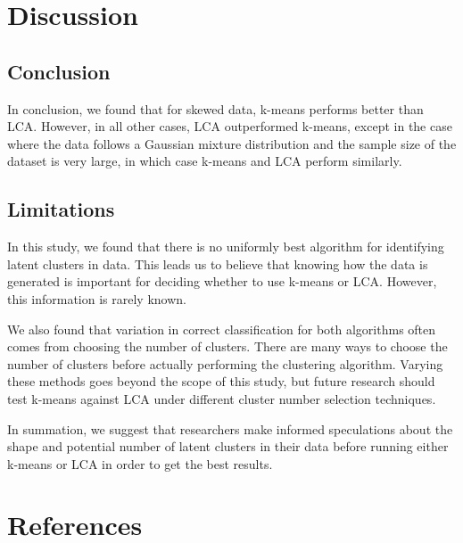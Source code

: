 \documentclass[
]{article}
\begin{document}
\hypertarget{discussion}{%
\section{Discussion}\label{discussion}}

\hypertarget{conclusion}{%
\subsection{Conclusion}\label{conclusion}}

In conclusion, we found that for skewed data, k-means performs better
than LCA. However, in all other cases, LCA outperformed k-means, except
in the case where the data follows a Gaussian mixture distribution and
the sample size of the dataset is very large, in which case k-means and
LCA perform similarly.

\hypertarget{limitations}{%
\subsection{Limitations}\label{limitations}}

In this study, we found that there is no uniformly best algorithm for
identifying latent clusters in data. This leads us to believe that
knowing how the data is generated is important for deciding whether to
use k-means or LCA. However, this information is rarely known.

We also found that variation in correct classification for both
algorithms often comes from choosing the number of clusters. There are
many ways to choose the number of clusters before actually performing
the clustering algorithm. Varying these methods goes beyond the scope of
this study, but future research should test k-means against LCA under
different cluster number selection techniques.

In summation, we suggest that researchers make informed speculations
about the shape and potential number of latent clusters in their data
before running either k-means or LCA in order to get the best results.

\hypertarget{references}{%
\section{References}\label{references}}
\end{document}

